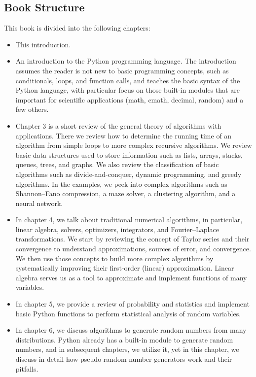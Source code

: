 \documentclass[justified,sixbynine]{tufte-book}
\theoremstyle{plain}%
\theoremstyle{definition}
\theoremstyle{remark}
\begin{document}
\begin{fullwidth}
\section{Book Structure}

This book is divided into the following chapters:

\begin{itemize}
\item This introduction.
\item An introduction to the Python programming language. The introduction assumes the reader is not new to basic programming concepts, such as conditionals, loops, and function calls, and teaches the basic syntax of the Python language, with particular focus on those built-in modules that are important for scientific applications (math, cmath, decimal, random) and a few others.
\item Chapter 3 is a short review of the general theory of algorithms with applications. There we review how to determine the running time of an algorithm from simple loops to more complex recursive algorithms. We review basic data structures used to store information such as lists, arrays, stacks, queues, trees, and graphs. We also review the classification of basic algorithms such as divide-and-conquer, dynamic programming, and greedy algorithms. In the examples, we peek into complex algorithms such as Shannon--Fano compression, a maze solver, a clustering algorithm, and a neural network.
\item In chapter 4, we talk about traditional numerical algorithms, in particular, linear algebra, solvers, optimizers, integrators, and Fourier--Laplace transformations. We start by reviewing the concept of Taylor series and their convergence to understand approximations, sources of error, and convergence. We then use those concepts to build more complex algorithms by systematically improving their first-order (linear) approximation. Linear algebra serves us as a tool to approximate and implement functions of many variables.
\item In chapter 5, we provide a review of probability and statistics and implement basic Python functions to perform statistical analysis of random variables.
\item In chapter 6, we discuss algorithms to generate random numbers from many distributions. Python already has a built-in module to generate random numbers, and in subsequent chapters, we utilize it, yet in this chapter, we discuss in detail how pseudo random number generators work and their pitfalls.

\end{itemize}
\end{fullwidth}
\end{document}
